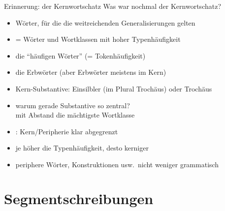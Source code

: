 \begin{frame}
  {Erinnerung: der Kernwortschatz}
  \pause
  Was war nochmal der Kernwortschatz?\\
  \Halbzeile
  \pause
  \begin{itemize}[<+->]
    \item Wörter, für die \alert{die weitreichenden Generalisierungen gelten}
    \item = Wörter und Wortklassen mit \alert{hoher Typenhäufigkeit}
    \item {} die "`häufigen Wörter"' (= Tokenhäufigkeit)
    \item {} die Erbwörter (aber Erbwörter meistens im Kern)
      \Halbzeile
    \item Kern-Substantive: Einsilbler (im Plural Trochäus) oder Trochäus
    \item warum gerade Substantive so zentral?\\
      \alert{mit Abstand die mächtigste Wortklasse}
      \Halbzeile
    \item {}: Kern\slash Peripherie klar abgegrenzt
    \item je höher die Typenhäufigkeit, desto kerniger
    \item periphere Wörter, Konstruktionen usw.\ \alert{nicht weniger grammatisch}
  \end{itemize}
\end{frame}

\section{Segment\-schreibungen}

